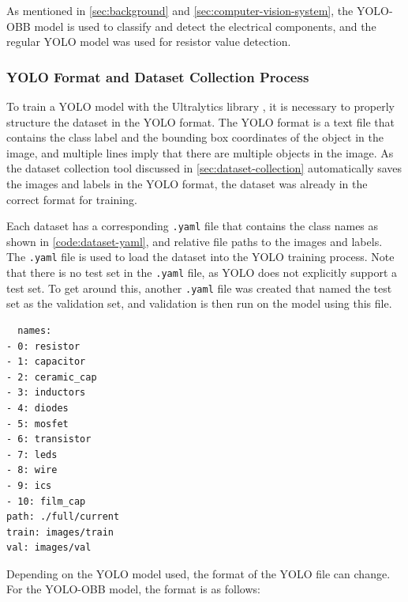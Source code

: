 As mentioned in \autoref{sec:background} and \autoref{sec:computer-vision-system}, the YOLO-OBB model \cite{yolov8} is used to classify and detect the electrical components, and the regular YOLO model was used for resistor value detection.

\subsubsection{YOLO Format and Dataset Collection Process}
To train a YOLO model with the Ultralytics library \cite{yolov8}, it is necessary to properly structure the dataset in the YOLO format. The YOLO format is a text file that contains the class label and the bounding box coordinates of the object in the image, and multiple lines imply that there are multiple objects in the image. As the dataset collection tool discussed in \autoref{sec:dataset-collection} automatically saves the images and labels in the YOLO format, the dataset was already in the correct format for training.

Each dataset has a corresponding \texttt{.yaml} file that contains the class names as shown in \autoref{code:dataset-yaml}, and relative file paths to the images and labels. The \texttt{.yaml} file is used to load the dataset into the YOLO training process. Note that there is no test set in the \texttt{.yaml} file, as YOLO does not explicitly support a test set. To get around this, another \texttt{.yaml} file was created that named the test set as the validation set, and validation is then run on the model using this file.

\begin{minipage}[H]{\textwidth}
  \centering
  \begin{verbatim}
  names:
- 0: resistor
- 1: capacitor
- 2: ceramic_cap
- 3: inductors
- 4: diodes
- 5: mosfet
- 6: transistor
- 7: leds
- 8: wire
- 9: ics
- 10: film_cap
path: ./full/current
train: images/train
val: images/val
  \end{verbatim}
  \label{code:dataset-yaml}
\end{minipage}

Depending on the YOLO model used, the format of the YOLO file can change. For the YOLO-OBB model, the format is as follows:

\begin{center}
\end{center}

